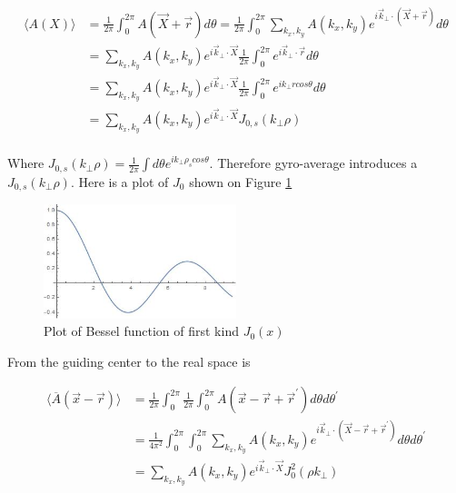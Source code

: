 \begin{equation}
\begin{aligned}\langle A(X)\rangle &=\frac{1}{2 \pi} \int_{0}^{2 \pi} A(\vec{X}+\vec{r}) d \theta=\frac{1}{2 \pi} \int_{0}^{2 \pi} \sum_{k_{x}, k_{y}} A\left(k_{x}, k_{y}\right) e^{i \vec{k}_{\perp} \cdot(\vec{X}+\vec{r})} d \theta \\ 
&=\sum_{k_{x}, k_{y}} A\left(k_{x}, k_{y}\right) e^{i \vec{k}_{\perp} \cdot \vec{X}} \frac{1}{2 \pi} \int_{0}^{2 \pi} e^{i \vec{k}_{\perp} \cdot \vec{r}} d \theta \\
&=\sum_{k_{x}, k_{y}} A\left(k_{x}, k_{y}\right) e^{i \vec{k}_{\perp} \cdot \vec{X}} \frac{1}{2 \pi} \int_{0}^{2 \pi} e^{ik_{\perp} r cos\theta} d \theta \\
&=\sum_{k_{x}, k_{y}} A\left(k_{x}, k_{y}\right) e^{i \vec{k}_{\perp} \cdot \vec{X}} J_{0,s}(k_{\perp}\rho )\\
\end{aligned}
\label{eq:gyro_avg}
\end{equation}

Where $J_{0,s}(k_{\perp}\rho )=\frac{1}{2\pi} \int d \theta e^{ik_{\perp}\rho_s cos \theta}$. Therefore gyro-average introduces a $J_{0,s}(k_{\perp}\rho )$. Here is a plot of $J_0$ shown on Figure \ref{fig:J0}

\begin{figure}[h] \centering
        \includegraphics[width=0.5\textwidth]{Image/J0.jpg}
        \caption{Plot of Bessel function of first kind $J_0(x)$}
        \label{fig:J0}
    \end{figure}

From the guiding center to the real space is \cite{merz}

\begin{equation}
\begin{aligned}\langle\overline{A}(\vec{x}-\vec{r})\rangle &=\frac{1}{2 \pi} \int_{0}^{2 \pi} \frac{1}{2 \pi} \int_{0}^{2 \pi} A\left(\vec{x}-\vec{r}+\vec{r}^{\prime}\right) d \theta d \theta^{\prime} \\ &=\frac{1}{4 \pi^{2}} \int_{0}^{2 \pi} \int_{0}^{2 \pi} \sum_{k_{x}, k_{y}} A\left(k_{x}, k_{y}\right) e^{i \vec{k}_{\perp} \cdot\left(\vec{X}-\vec{r}+\vec{r}^{\prime}\right)} d \theta d \theta^{\prime} \\ &=\sum_{k_{x}, k_{y}} A\left(k_{x}, k_{y}\right) e^{i \vec{k}_{\perp} \cdot \vec{X}} J_{0}^{2}\left(\rho k_{\perp}\right) \end{aligned}
\end{equation}

